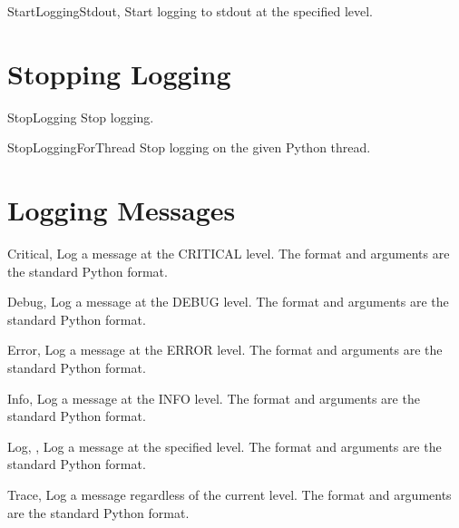 \documentclass{manual}
\begin{document}
\begin{funcdesc}{StartLoggingStdout}{, }
  Start logging to stdout at the specified level.
\end{funcdesc}


\section{Stopping Logging \label{pyStopLogging}}

\begin{funcdesc}{StopLogging}{}
  Stop logging.
\end{funcdesc}

\begin{funcdesc}{StopLoggingForThread}{}
  Stop logging on the given Python thread.
\end{funcdesc}


\section{Logging Messages \label{pyLogMessages}}

\begin{funcdesc}{Critical}{, }
  Log a message at the CRITICAL level. The format and arguments are the
  standard Python format.
\end{funcdesc}

\begin{funcdesc}{Debug}{, }
  Log a message at the DEBUG level. The format and arguments are the standard
  Python format.
\end{funcdesc}

\begin{funcdesc}{Error}{, }
  Log a message at the ERROR level. The format and arguments are the standard
  Python format.
\end{funcdesc}

\begin{funcdesc}{Info}{, }
  Log a message at the INFO level. The format and arguments are the standard
  Python format.
\end{funcdesc}

\begin{funcdesc}{Log}{, , }
  Log a message at the specified level. The format and arguments are the
  standard Python format.
\end{funcdesc}

\begin{funcdesc}{Trace}{, }
  Log a message regardless of the current level. The format and arguments are
  the standard Python format.
\end{funcdesc}
\end{document}
